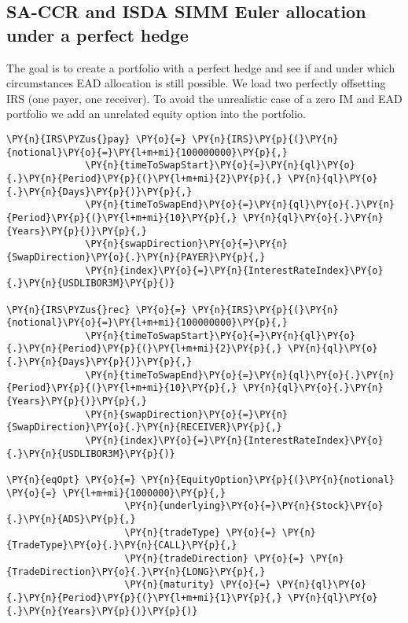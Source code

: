     

    
    \hypertarget{sa-ccr-and-isda-simm-euler-allocation-under-a-perfect-hedge}{%
\subsection{SA-CCR and ISDA SIMM Euler allocation under a perfect
hedge}\label{sa-ccr-and-isda-simm-euler-allocation-under-a-perfect-hedge}}

The goal is to create a portfolio with a perfect hedge and see if and
under which circumstances EAD allocation is still possible. We load two
perfectly offsetting IRS (one payer, one receiver). To avoid the
unrealistic case of a zero IM and EAD portfolio we add an unrelated
equity option into the portfolio.

    \begin{tcolorbox}[breakable, size=fbox, boxrule=1pt, pad at break*=1mm,colback=cellbackground, colframe=cellborder]
\begin{Verbatim}[commandchars=\\\{\}]
\PY{n}{IRS\PYZus{}pay} \PY{o}{=} \PY{n}{IRS}\PY{p}{(}\PY{n}{notional}\PY{o}{=}\PY{l+m+mi}{100000000}\PY{p}{,}
              \PY{n}{timeToSwapStart}\PY{o}{=}\PY{n}{ql}\PY{o}{.}\PY{n}{Period}\PY{p}{(}\PY{l+m+mi}{2}\PY{p}{,} \PY{n}{ql}\PY{o}{.}\PY{n}{Days}\PY{p}{)}\PY{p}{,}
              \PY{n}{timeToSwapEnd}\PY{o}{=}\PY{n}{ql}\PY{o}{.}\PY{n}{Period}\PY{p}{(}\PY{l+m+mi}{10}\PY{p}{,} \PY{n}{ql}\PY{o}{.}\PY{n}{Years}\PY{p}{)}\PY{p}{,}
              \PY{n}{swapDirection}\PY{o}{=}\PY{n}{SwapDirection}\PY{o}{.}\PY{n}{PAYER}\PY{p}{,}
              \PY{n}{index}\PY{o}{=}\PY{n}{InterestRateIndex}\PY{o}{.}\PY{n}{USDLIBOR3M}\PY{p}{)}

\PY{n}{IRS\PYZus{}rec} \PY{o}{=} \PY{n}{IRS}\PY{p}{(}\PY{n}{notional}\PY{o}{=}\PY{l+m+mi}{100000000}\PY{p}{,}
              \PY{n}{timeToSwapStart}\PY{o}{=}\PY{n}{ql}\PY{o}{.}\PY{n}{Period}\PY{p}{(}\PY{l+m+mi}{2}\PY{p}{,} \PY{n}{ql}\PY{o}{.}\PY{n}{Days}\PY{p}{)}\PY{p}{,}
              \PY{n}{timeToSwapEnd}\PY{o}{=}\PY{n}{ql}\PY{o}{.}\PY{n}{Period}\PY{p}{(}\PY{l+m+mi}{10}\PY{p}{,} \PY{n}{ql}\PY{o}{.}\PY{n}{Years}\PY{p}{)}\PY{p}{,}
              \PY{n}{swapDirection}\PY{o}{=}\PY{n}{SwapDirection}\PY{o}{.}\PY{n}{RECEIVER}\PY{p}{,}
              \PY{n}{index}\PY{o}{=}\PY{n}{InterestRateIndex}\PY{o}{.}\PY{n}{USDLIBOR3M}\PY{p}{)}

\PY{n}{eqOpt} \PY{o}{=} \PY{n}{EquityOption}\PY{p}{(}\PY{n}{notional} \PY{o}{=} \PY{l+m+mi}{1000000}\PY{p}{,}
                     \PY{n}{underlying}\PY{o}{=}\PY{n}{Stock}\PY{o}{.}\PY{n}{ADS}\PY{p}{,}
                     \PY{n}{tradeType} \PY{o}{=} \PY{n}{TradeType}\PY{o}{.}\PY{n}{CALL}\PY{p}{,}
                     \PY{n}{tradeDirection} \PY{o}{=} \PY{n}{TradeDirection}\PY{o}{.}\PY{n}{LONG}\PY{p}{,}
                     \PY{n}{maturity} \PY{o}{=} \PY{n}{ql}\PY{o}{.}\PY{n}{Period}\PY{p}{(}\PY{l+m+mi}{1}\PY{p}{,} \PY{n}{ql}\PY{o}{.}\PY{n}{Years}\PY{p}{)}\PY{p}{)}


\end{Verbatim}
\end{tcolorbox}
